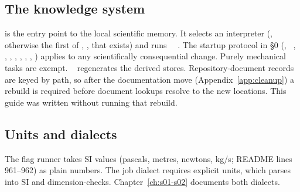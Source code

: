 \subsection{The knowledge system}
 is the entry point to the local scientific memory. It selects an interpreter (, otherwise the first of , ,  that exists) and runs ~~. The startup protocol in  §0 (, ~, , , , , , , ) applies to any scientifically consequential change. Purely mechanical tasks are exempt. ~ regenerates the derived stores. Repository-document records are keyed by path, so after the documentation move (Appendix~\ref{app:cleanup}) a rebuild is required before document lookups resolve to the new locations. This guide was written without running that rebuild.

\subsection{Units and dialects}
The flag runner takes SI values (pascals, metres, newtons, kg/s; README lines 961--962) as plain numbers. The job dialect requires explicit units, which  parses into SI and dimension-checks. Chapter~\ref{ch:s01-s02} documents both dialects.
